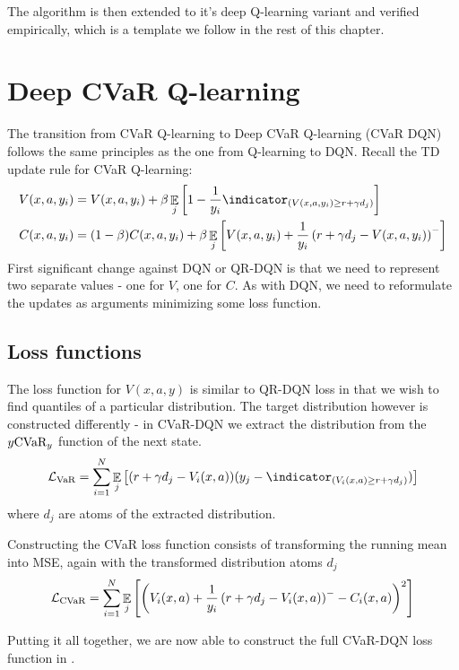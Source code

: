 The algorithm is then extended to it's deep Q-learning variant and verified empirically, which is a template we follow in the rest of this chapter.

\section{Deep CVaR Q-learning}
The transition from CVaR Q-learning to Deep CVaR Q-learning (CVaR DQN) follows the same principles as the one from Q-learning to DQN. Recall the TD update rule for CVaR Q-learning:
\begin{align*}
V(x, a, y_i) &= V(x, a, y_i) + \beta \expect_j\bsquare{1 - \dfrac{1}{y_i}\indicator_{(V(x, a, y_i) \ge r+\gamma d_j)}}\\
C(x, a, y_i) &= (1-\beta)C(x, a, y_i) + \beta\expect_j\bsquare{V(x, a, y_i) + \dfrac{1}{y_i}\bround{r+\gamma d_j - V(x, a, y_i)}^-}
\end{align*}
First significant change against DQN or QR-DQN is that we need to represent two separate values - one for $V$, one for $C$. As with DQN, we need to reformulate the updates as arguments minimizing some loss function.

\subsection{Loss functions}
The loss function for $V(x, a, y)$ is similar to QR-DQN loss in that we wish to find quantiles of a particular distribution. The target distribution however is constructed differently - in CVaR-DQN we extract the distribution from the $y\text{CVaR}_y$ function of the next state.
\begin{equation}
\mathcal{L}_{\var}=\sum_{i=1}^{N} \expect_j\bsquare{(r + \gamma d_j - V_i(x, a))(y_j - \indicator_{(V_i(x, a) \ge r + \gamma d_j)})}
\end{equation}
where $d_j$ are atoms of the extracted distribution.

Constructing the CVaR loss function consists of transforming the running mean into MSE, again with the transformed distribution atoms $d_j$
\begin{equation}
\mathcal{L}_{\text{CVaR}}=\sum_{i=1}^{N} \mathop{\mathbb{E}}_j\left[ {\left( {V_i(x, a) + \frac{1}{y_i} \left( {r + \gamma d_j - V_i(x, a)} \right)^- - C_i(x, a)} \right)^2} \right]
\end{equation}


Putting it all together, we are now able to construct the full CVaR-DQN loss function in .

